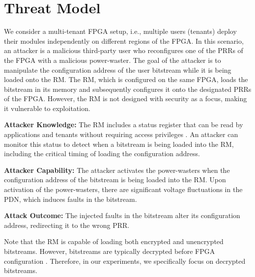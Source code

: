 \section{Threat Model}

We consider a multi-tenant FPGA setup, i.e., multiple users (tenants) deploy their modules independently on different regions of the FPGA. In this scenario, an attacker is a malicious third-party user who reconfigures one of the PRRs of the FPGA with a malicious power-waster. The goal of the attacker is to manipulate the configuration address of the user bitstream while it is being loaded onto the RM. The RM, which is configured on the same FPGA, loads the bitstream in its memory and subsequently configures it onto the designated PRRs of the FPGA. However, the RM is not designed with security as a focus, making it vulnerable to exploitation. 

\textbf{Attacker Knowledge:} The RM includes a status register that can be read by  applications and tenants without requiring access privileges \cite{7946114}. An attacker can monitor this status  to detect when a bitstream is being loaded into the RM, including the critical timing of loading the configuration address.

\textbf{Attacker Capability:} The attacker activates the power-wasters when the  configuration address of the bitstream is being loaded into the RM. Upon activation of the power-wasters, there are significant voltage fluctuations in the PDN, which induces faults in the bitstream.


\textbf{Attack Outcome:} The injected faults in the bitstream alter its configuration address, redirecting it to the wrong PRR. 

Note that the RM is capable of loading both encrypted and unencrypted bitstreams. However, bitstreams are typically decrypted before FPGA configuration \cite{ref_ultra}. Therefore, in our experiments, we specifically focus on decrypted bitstreams.

